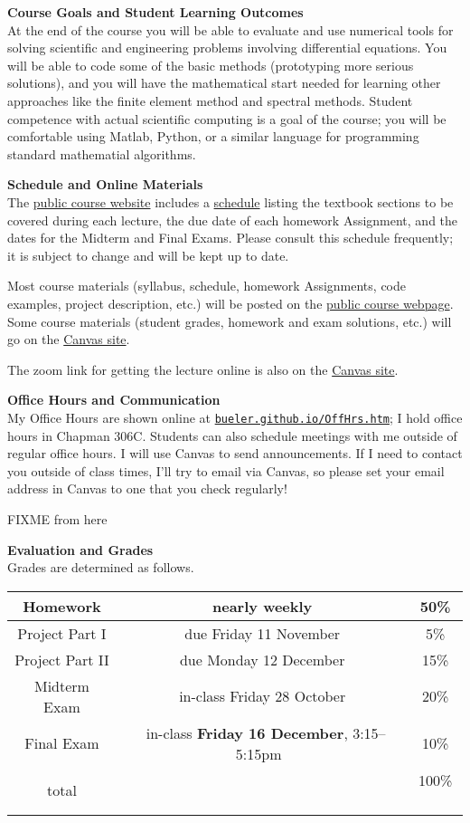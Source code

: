 \documentclass[12pt]{article}
\renewcommand{\emph}[1]{\textsf{\textbf{#1}}}
\newcommand{\localhead}[1]{\par\smallskip\textbf{#1} \smallskip\nobreak\\}%
\def\heading#1{\localhead{\large\emph{#1}}}
\begin{document}
\heading{Course Goals and Student Learning Outcomes}
At the end of the course you will be able to evaluate and use numerical tools for solving scientific and engineering problems involving differential equations.  You will be able to code some of the basic methods (prototyping more serious solutions), and you will have the mathematical start needed for learning other approaches like the finite element method and spectral methods.  Student competence with actual scientific computing is a goal of the course; you will be comfortable using Matlab, Python, or a similar language for programming standard mathematial algorithms.


\heading{Schedule and Online Materials}
The \href{https://bueler.github.io/nade/}{public course website} includes a \href{https://bueler.github.io/nade/assets/general/schedule.pdf}{schedule} listing the textbook sections to be covered during each lecture, the due date of each homework Assignment, and the dates for the Midterm and Final Exams.  Please consult this schedule frequently; it is subject to change and will be kept up to date.

Most course materials (syllabus, schedule, homework Assignments, code examples, project description, etc.) will be posted on the \href{https://bueler.github.io/nade/}{public course webpage}.  Some course materials (student grades, homework and exam solutions, etc.) will go on the \href{https://canvas.alaska.edu/courses/13208}{Canvas site}.

The zoom link for getting the lecture online is also on the \href{https://canvas.alaska.edu/courses/13208}{Canvas site}.


\heading{Office Hours and Communication}
My Office Hours are shown online at \href{http://bueler.github.io/OffHrs.htm}{\texttt{bueler.github.io/OffHrs.htm}}; I hold office hours in Chapman 306C.  Students can also schedule meetings with me outside of regular office hours.  I will use Canvas to send announcements.  If I need to contact you outside of class times, I'll try to email via Canvas, so please set your email address in Canvas to one that you check regularly!


FIXME from here

\heading{Evaluation and Grades}
Grades are determined as follows.

\begin{tabular}{|c|c|c|}
\hline
Homework & nearly weekly & 50\% \\
\hline
Project Part I & due Friday 11 November & 5\%  \\
\hline
Project Part II & due Monday 12 December & 15\%  \\
\hline
Midterm Exam & in-class Friday 28 October & 20\%  \\
\hline
Final Exam & \, in-class \emph{Friday 16 December}, 3:15--5:15pm \, & 10\% \\
\hline
total & & 100\% \, \\
\hline
\end{tabular}
\end{document}
